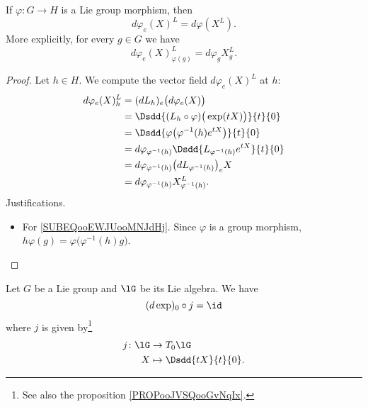 \begin{lemma}           \label{LEMooKSTKooNCnxzB}
	If \( \varphi\colon G\to H\) is a Lie group morphism, then
	\begin{equation}
		d\varphi_e(X)^L=d\varphi(X^L).
	\end{equation}
	More explicitly, for every \( g\in G\) we have
	\begin{equation}
		d\varphi_e(X)^L_{\varphi(g)}=d\varphi_gX^L_g.
	\end{equation}
\end{lemma}

\begin{proof}
	Let \( h\in H\). We compute the vector field \( d\varphi_e(X)^L\) at \( h\):
	\begin{subequations}
		\begin{align}
			d\varphi_e(X)^L_h & =(dL_h)_e\big( d\varphi_e(X) \big)                                                     \\
			                  & =\Dsdd{ (L_h\circ\varphi)\big( \exp(tX) \big) }{t}{0}                                  \\
			                  & =\Dsdd{ \varphi\big( \varphi^{-1}(h) e^{tX} \big) }{t}{0}  \label{SUBEQooEWJUooMNJdHj} \\
			                  & =d\varphi_{\varphi^{-1}(h)}\Dsdd{ L_{\varphi^{-1}(h)} e^{tX} }{t}{0}                   \\
			                  & =d\varphi_{\varphi^{-1}(h)}\big( dL_{\varphi^{-1}(h)} \big)_eX                         \\
			                  & =d\varphi_{\varphi^{-1}(h)}X^L_{\varphi^{-1}(h)}.
		\end{align}
	\end{subequations}
	Justifications.
	\begin{itemize}
		\item For \eqref{SUBEQooEWJUooMNJdHj}. Since \( \varphi\) is a group morphism, \( h\varphi(g)=\varphi\big( \varphi^{-1}(h)g \big)\).
	\end{itemize}
\end{proof}

\begin{lemma}     \label{LEMooHQYMooJjdKkG}
	Let \( G\) be a Lie group and \( \lG\) be its Lie algebra. We have
	\begin{equation}
		(d\exp)_0\circ j=\id
	\end{equation}
	where \( j\) is given by\footnote{See also the proposition \ref{PROPooJVSQooGvNqIx}.}
	\begin{equation}
		\begin{aligned}
			j\colon \lG & \to T_0\lG                 \\
			X           & \mapsto \Dsdd{ tX }{t}{0}.
		\end{aligned}
	\end{equation}
\end{lemma}

